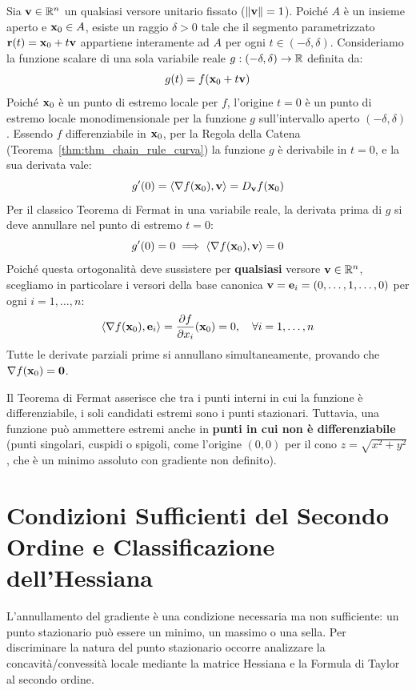 \begin{dimostrazione}
Sia $\mathbf{v} \in \mathbb{R}^n$ un qualsiasi versore unitario fissato ($\lVert\mathbf{v}\rVert = 1$).
Poiché $A$ è un insieme aperto e $\mathbf{x}_0 \in A$, esiste un raggio $\delta > 0$ tale che il segmento parametrizzato $\mathbf{r}(t) = \mathbf{x}_0 + t\mathbf{v}$ appartiene interamente ad $A$ per ogni $t \in (-\delta, \delta)$.
Consideriamo la funzione scalare di una sola variabile reale $g: (-\delta, \delta) \to \mathbb{R}$ definita da:
\[
g(t) = f(\mathbf{x}_0 + t\mathbf{v})
\]
Poiché $\mathbf{x}_0$ è un punto di estremo locale per $f$, l'origine $t = 0$ è un punto di estremo locale monodimensionale per la funzione $g$ sull'intervallo aperto $(-\delta, \delta)$.
Essendo $f$ differenziabile in $\mathbf{x}_0$, per la Regola della Catena (Teorema~\ref{thm:thm_chain_rule_curva}) la funzione $g$ è derivabile in $t = 0$, e la sua derivata vale:
\[
g'(0) = \langle\nabla f(\mathbf{x}_0), \mathbf{v}\rangle = D_{\mathbf{v}} f(\mathbf{x}_0)
\]
Per il classico Teorema di Fermat in una variabile reale, la derivata prima di $g$ si deve annullare nel punto di estremo $t = 0$:
\[
g'(0) = 0 \implies \langle\nabla f(\mathbf{x}_0), \mathbf{v}\rangle = 0
\]
Poiché questa ortogonalità deve sussistere per \textbf{qualsiasi} versore $\mathbf{v} \in \mathbb{R}^n$, scegliamo in particolare i versori della base canonica $\mathbf{v} = \mathbf{e}_i = (0, \dots, 1, \dots, 0)$ per ogni $i = 1, \dots, n$:
\[
\langle\nabla f(\mathbf{x}_0), \mathbf{e}_i\rangle = \frac{\partial f}{\partial x_i}(\mathbf{x}_0) = 0, \quad \forall i=1,\dots,n
\]
Tutte le derivate parziali prime si annullano simultaneamente, provando che $\nabla f(\mathbf{x}_0) = \mathbf{0}$.
\end{dimostrazione}

\begin{osservazione}
Il Teorema di Fermat asserisce che tra i punti interni in cui la funzione è differenziabile, i soli candidati estremi sono i punti stazionari. Tuttavia, una funzione può ammettere estremi anche in \textbf{punti in cui non è differenziabile} (punti singolari, cuspidi o spigoli, come l'origine $(0,0)$ per il cono $z = \sqrt{x^2+y^2}$, che è un minimo assoluto con gradiente non definito).
\end{osservazione}

\section{Condizioni Sufficienti del Secondo Ordine e Classificazione dell'Hessiana}

L'annullamento del gradiente è una condizione necessaria ma non sufficiente: un punto stazionario può essere un minimo, un massimo o una sella. Per discriminare la natura del punto stazionario occorre analizzare la concavità/convessità locale mediante la matrice Hessiana e la Formula di Taylor al secondo ordine.

